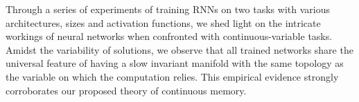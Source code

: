 \documentclass{article} %
\newcommand{\mpcomment}[1]{\textcolor{mpcolor}{(#1)}}
\newcounter{ct}
\theoremstyle{definition}
\theoremstyle{remark}
\begin{document}
Through a series of experiments of training RNNs on two tasks with various architectures, sizes and activation functions, we shed light on the intricate workings of neural networks when confronted with continuous-variable tasks.
Amidst the variability of solutions, we observe that all trained networks share the universal feature of having a slow invariant manifold with the same topology as the variable on which the computation relies.
This empirical evidence strongly corroborates our proposed theory of continuous memory.












%
%
\end{document}
